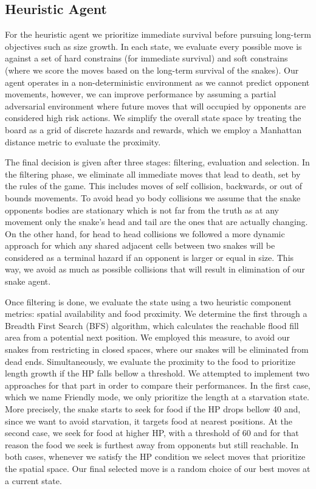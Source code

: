 \documentclass[12pt,a4paper]{article}
\begin{document}
\subsection{Heuristic Agent}\label{sec:heur-agent}
For the heuristic agent we prioritize immediate survival before pursuing long-term objectives such as size growth. In each state, we evaluate every possible move is against a set of hard constrains (for immediate survival) and soft constrains (where we score the moves based on the long-term survival of the snakes). Our agent operates in a non-deterministic environment as we cannot predict opponent movements, however, we can improve performance by assuming a partial adversarial environment where future moves that will occupied by opponents are considered high risk actions. We simplify the overall state space by treating the board as a grid of discrete hazards and rewards, which we employ a Manhattan distance metric to evaluate the proximity. 

The final decision is given after three stages: filtering, evaluation and selection. In the filtering phase, we eliminate all immediate moves that lead to death, set by the rules of the game. This includes moves of self collision, backwards, or out of bounds movements. To avoid head yo body collisions we assume that the snake opponents bodies are stationary which is not far from the truth as at any movement only the snake's head and tail are the ones that are actually changing. On the other hand, for head to head collisions we followed a more dynamic approach for which any shared adjacent cells between two snakes will be considered as a terminal hazard if an opponent is larger or equal in size. This way, we avoid as much as possible collisions that will result in elimination of our snake agent. 

Once filtering is done, we evaluate the state using a two heuristic component metrics: spatial availability and food proximity. We determine the first through a Breadth First Search (BFS) algorithm, which calculates the reachable flood fill area from a potential next position. We employed this measure, to avoid our snakes from restricting in closed spaces, where our snakes will be eliminated from dead ends. Simultaneously, we evaluate the proximity to the food to prioritize length growth if the HP falls bellow a threshold. We attempted to implement two approaches for that part in order to compare their performances. In the first case, which we name Friendly mode, we only prioritize the length at a starvation state. More precisely, the snake starts to seek for food if the HP drops bellow 40 and, since we want to avoid starvation, it targets food at nearest positions. At the second case, we seek for food at higher HP, with a threshold of 60 and for that reason the food we seek is furthest away from opponents but still reachable. In both cases, whenever we satisfy the HP condition we select moves that prioritize the spatial space. Our final selected move is a random choice of our best moves at a current state.
\end{document}
